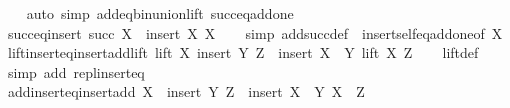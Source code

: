 \begin{isabellebody}
%
\isadelimproof
\ \ %
\endisadelimproof
%
\isatagproof
{}\isamarkupfalse%
\ {\isacharparenleft}{\kern0pt}auto\ simp{\isacharcolon}{\kern0pt}\ add{\isacharunderscore}{\kern0pt}eq{\isacharunderscore}{\kern0pt}bin{\isacharunderscore}{\kern0pt}union{\isacharunderscore}{\kern0pt}lift\ succ{\isacharunderscore}{\kern0pt}eq{\isacharunderscore}{\kern0pt}add{\isacharunderscore}{\kern0pt}one{\isacharparenright}{\kern0pt}%
\endisatagproof
{\isafoldproof}%
%
\isadelimproof
\isanewline
%
\endisadelimproof
\isanewline
{}\isamarkupfalse%
\ succ{\isacharunderscore}{\kern0pt}eq{\isacharunderscore}{\kern0pt}insert{\isacharcolon}{\kern0pt}\ {\isachardoublequoteopen}succ\ X\ {\isacharequal}{\kern0pt}\ insert\ X\ X{\isachardoublequoteclose}\isanewline
%
\isadelimproof
\ \ %
\endisadelimproof
%
\isatagproof
{}\isamarkupfalse%
\ {\isacharparenleft}{\kern0pt}simp\ add{\isacharcolon}{\kern0pt}succ{\isacharunderscore}{\kern0pt}def\ \ insert{\isacharunderscore}{\kern0pt}self{\isacharunderscore}{\kern0pt}eq{\isacharunderscore}{\kern0pt}add{\isacharunderscore}{\kern0pt}one{\isacharbrackleft}{\kern0pt}of\ X{\isacharbrackright}{\kern0pt}{\isacharparenright}{\kern0pt}%
\endisatagproof
{\isafoldproof}%
%
\isadelimproof
\isanewline
%
\endisadelimproof
\isanewline
{}\isamarkupfalse%
\ lift{\isacharunderscore}{\kern0pt}insert{\isacharunderscore}{\kern0pt}eq{\isacharunderscore}{\kern0pt}insert{\isacharunderscore}{\kern0pt}add{\isacharunderscore}{\kern0pt}lift{\isacharcolon}{\kern0pt}\ {\isachardoublequoteopen}lift\ X\ {\isacharparenleft}{\kern0pt}insert\ Y\ Z{\isacharparenright}{\kern0pt}\ {\isacharequal}{\kern0pt}\ insert\ {\isacharparenleft}{\kern0pt}X\ {\isacharplus}{\kern0pt}\ Y{\isacharparenright}{\kern0pt}\ {\isacharparenleft}{\kern0pt}lift\ X\ Z{\isacharparenright}{\kern0pt}{\isachardoublequoteclose}\isanewline
%
\isadelimproof
\ \ %
\endisadelimproof
%
\isatagproof
{}\isamarkupfalse%
\ lift{\isacharunderscore}{\kern0pt}def\ \isamarkupfalse%
\ {\isacharparenleft}{\kern0pt}simp\ add{\isacharcolon}{\kern0pt}\ repl{\isacharunderscore}{\kern0pt}insert{\isacharunderscore}{\kern0pt}eq{\isacharparenright}{\kern0pt}%
\endisatagproof
{\isafoldproof}%
%
\isadelimproof
\isanewline
%
\endisadelimproof
\isanewline
{}\isamarkupfalse%
\ add{\isacharunderscore}{\kern0pt}insert{\isacharunderscore}{\kern0pt}eq{\isacharunderscore}{\kern0pt}insert{\isacharunderscore}{\kern0pt}add{\isacharcolon}{\kern0pt}\ {\isachardoublequoteopen}X\ {\isacharplus}{\kern0pt}\ insert\ Y\ Z\ {\isacharequal}{\kern0pt}\ insert\ {\isacharparenleft}{\kern0pt}X\ {\isacharplus}{\kern0pt}\ Y{\isacharparenright}{\kern0pt}\ {\isacharparenleft}{\kern0pt}X\ {\isacharplus}{\kern0pt}\ Z{\isacharparenright}{\kern0pt}{\isachardoublequoteclose}\isanewline

\end{isabellebody}
